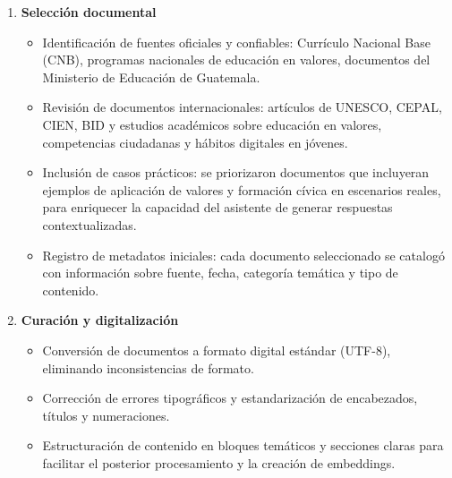 \begin{enumerate}

      \item \textbf{Selección documental}
            \begin{itemize}
                  \item Identificación de fuentes oficiales y confiables: Currículo Nacional Base
                        (CNB), programas nacionales de educación en valores, documentos del Ministerio
                        de Educación de Guatemala.
                  \item Revisión de documentos internacionales: artículos de UNESCO, CEPAL, CIEN, BID y
                        estudios académicos sobre educación en valores, competencias ciudadanas y
                        hábitos digitales en jóvenes.
                  \item Inclusión de casos prácticos: se priorizaron documentos que incluyeran ejemplos
                        de aplicación de valores y formación cívica en escenarios reales, para
                        enriquecer la capacidad del asistente de generar respuestas contextualizadas.
                  \item Registro de metadatos iniciales: cada documento seleccionado se catalogó con
                        información sobre fuente, fecha, categoría temática y tipo de contenido.
            \end{itemize}

      \item \textbf{Curación y digitalización}
            \begin{itemize}
                  \item Conversión de documentos a formato digital estándar (UTF-8), eliminando
                        inconsistencias de formato.
                  \item Corrección de errores tipográficos y estandarización de encabezados, títulos y
                        numeraciones.
                  \item Estructuración de contenido en bloques temáticos y secciones claras para
                        facilitar el posterior procesamiento y la creación de embeddings.
            \end{itemize}


\end{enumerate}
